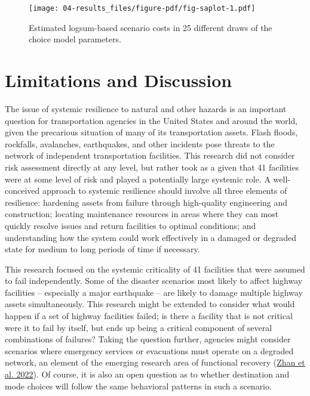\documentclass[]{ascelike-new}
\begin{document}
\begin{figure}

{\centering \texttt{[image: 04-results\_files/figure-pdf/fig-saplot-1.pdf]}

}

\caption{\label{fig-saplot}Estimated logsum-based scenario costs in 25
different draws of the choice model parameters.}

\end{figure}


\hypertarget{limitations-and-discussion}{%
\section{Limitations and Discussion}\label{limitations-and-discussion}}

The issue of systemic resilience to natural and other hazards is an
important question for transportation agencies in the United States and
around the world, given the precarious situation of many of its
transportation assets. Flash floods, rockfalls, avalanches, earthquakes,
and other incidents pose threats to the network of independent
transportation facilities. This research did not consider risk
assessment directly at any level, but rather took as a given that 41
facilities were at some level of risk and played a potentially large
systemic role. A well-conceived approach to systemic resilience should
involve all three elements of resilience: hardening assets from failure
through high-quality engineering and construction; locating maintenance
resources in areas where they can most quickly resolve issues and return
facilities to optimal conditions; and understanding how the system could
work effectively in a damaged or degraded state for medium to long
periods of time if necessary.

This research focused on the systemic criticality of 41 facilities that
were assumed to fail independently. Some of the disaster scenarios most
likely to affect highway facilities -- especially a major earthquake --
are likely to damage multiple highway assets simultaneously. This
research might be extended to consider what would happen if a set of
highway facilities failed; is there a facility that is not critical were
it to fail by itself, but ends up being a critical component of several
combinations of failures? Taking the question further, agencies might
consider scenarios where emergency services or evacuations must operate
on a degraded network, an element of the emerging research area of
functional recovery (\protect\hyperlink{ref-zhan2022}{Zhan et al.
2022}). Of course, it is also an open question as to whether destination
and mode choices will follow the same behavioral patterns in such a
scenario.
\end{document}
